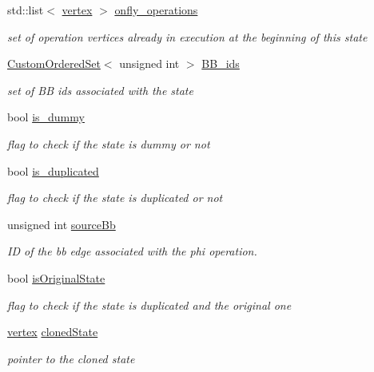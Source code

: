 \begin{DoxyCompactItemize}
std\+::list$<$ \hyperlink{graph_8hpp_abefdcf0544e601805af44eca032cca14}{vertex} $>$ \hyperlink{structStateInfo_a06b35ad4218b0bc1e3e952357aa14111}{onfly\+\_\+operations}
\begin{DoxyCompactList}\small\item\em set of operation vertices already in execution at the beginning of this state \end{DoxyCompactList}\item 
\hyperlink{classCustomOrderedSet}{Custom\+Ordered\+Set}$<$ unsigned int $>$ \hyperlink{structStateInfo_ab90956fbe5d140d76c113535b830b41a}{B\+B\+\_\+ids}
\begin{DoxyCompactList}\small\item\em set of BB ids associated with the state \end{DoxyCompactList}\item 
bool \hyperlink{structStateInfo_a2e25972bb3ed0e6d42b33f71db4da2bd}{is\+\_\+dummy}
\begin{DoxyCompactList}\small\item\em flag to check if the state is dummy or not \end{DoxyCompactList}\item 
bool \hyperlink{structStateInfo_ad1d889cb48ee33781bea376337901fda}{is\+\_\+duplicated}
\begin{DoxyCompactList}\small\item\em flag to check if the state is duplicated or not \end{DoxyCompactList}\item 
unsigned int \hyperlink{structStateInfo_a32780bd5c51bed1b2bed02bb4996a90c}{source\+Bb}
\begin{DoxyCompactList}\small\item\em ID of the bb edge associated with the phi operation. \end{DoxyCompactList}\item 
bool \hyperlink{structStateInfo_aa28e78be94499966b41c6011dffdefb7}{is\+Original\+State}
\begin{DoxyCompactList}\small\item\em flag to check if the state is duplicated and the original one \end{DoxyCompactList}\item 
\hyperlink{graph_8hpp_abefdcf0544e601805af44eca032cca14}{vertex} \hyperlink{structStateInfo_a445827ad7c0440518f07baf5c62eb20b}{cloned\+State}
\begin{DoxyCompactList}\small\item\em pointer to the cloned state \end{DoxyCompactList}\item 

\end{DoxyCompactItemize}
